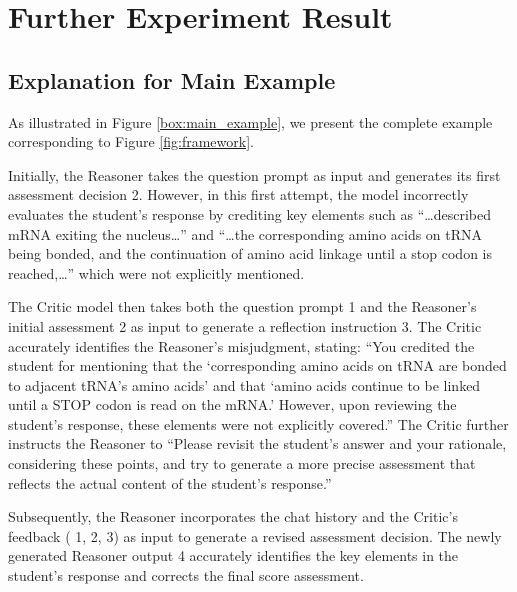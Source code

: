 
\section{Further Experiment Result} \label{sec:further_experiment}

\subsection{Explanation for Main Example} \label{sec:figure_full_example}
As illustrated in Figure \ref{box:main_example}, we present the complete example corresponding to Figure \ref{fig:framework}. 

Initially, the Reasoner takes the question prompt as input and generates its first assessment decision \textcircled{\raisebox{-0.3pt} {\scriptsize2}}. However, in this first attempt, the model incorrectly evaluates the student’s response by crediting key elements such as ``…described mRNA exiting the nucleus…'' and ``…the corresponding amino acids on tRNA being bonded, and the continuation of amino acid linkage until a stop codon is reached,…'' which were not explicitly mentioned.

The Critic model then takes both the question prompt \textcircled{\raisebox{-0.3pt} {\scriptsize1}} and the Reasoner’s initial assessment \textcircled{\raisebox{-0.3pt} {\scriptsize2}} as input to generate a reflection instruction \textcircled{\raisebox{-0.3pt} {\scriptsize3}}. The Critic accurately identifies the Reasoner’s misjudgment, stating: ``You credited the student for mentioning that the `corresponding amino acids on tRNA are bonded to adjacent tRNA's amino acids' and that `amino acids continue to be linked until a STOP codon is read on the mRNA.' However, upon reviewing the student's response, these elements were not explicitly covered.'' The Critic further instructs the Reasoner to ``Please revisit the student's answer and your rationale, considering these points, and try to generate a more precise assessment that reflects the actual content of the student’s response.''

Subsequently, the Reasoner incorporates the chat history and the Critic's feedback (\textcircled{\raisebox{-0.3pt} {\scriptsize1}}, \textcircled{\raisebox{-0.3pt} {\scriptsize2}}, \textcircled{\raisebox{-0.3pt} {\scriptsize3}}) as input to generate a revised assessment decision. The newly generated Reasoner output \textcircled{\raisebox{-0.3pt} {\scriptsize4}} accurately identifies the key elements in the student's response and corrects the final score assessment.


